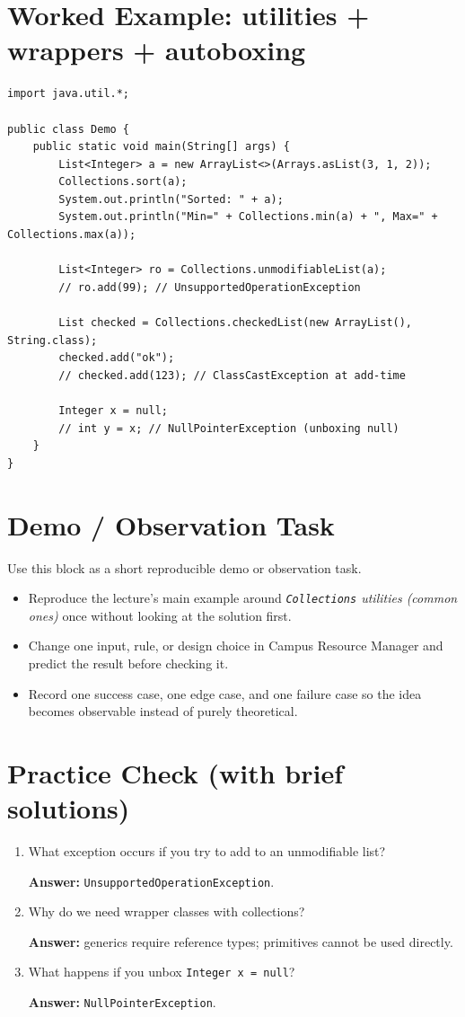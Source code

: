 \documentclass[11pt]{article}
\begin{document}
\section{Worked Example: utilities + wrappers + autoboxing}
\begin{lstlisting}
import java.util.*;

public class Demo {
    public static void main(String[] args) {
        List<Integer> a = new ArrayList<>(Arrays.asList(3, 1, 2));
        Collections.sort(a);
        System.out.println("Sorted: " + a);
        System.out.println("Min=" + Collections.min(a) + ", Max=" + Collections.max(a));

        List<Integer> ro = Collections.unmodifiableList(a);
        // ro.add(99); // UnsupportedOperationException

        List checked = Collections.checkedList(new ArrayList(), String.class);
        checked.add("ok");
        // checked.add(123); // ClassCastException at add-time

        Integer x = null;
        // int y = x; // NullPointerException (unboxing null)
    }
}
\end{lstlisting}

\section{Demo / Observation Task}
Use this block as a short reproducible demo or observation task.
\begin{itemize}
  \item Reproduce the lecture's main example around \textit{\texttt{Collections} utilities (common ones)} once without looking at the solution first.
  \item Change one input, rule, or design choice in Campus Resource Manager and predict the result before checking it.
  \item Record one success case, one edge case, and one failure case so the idea becomes observable instead of purely theoretical.
\end{itemize}
\notesources{\OOPSUnitVSources}

\section{Practice Check (with brief solutions)}
\begin{enumerate}
  \item What exception occurs if you try to add to an unmodifiable list?\par
  \textbf{Answer:} \texttt{UnsupportedOperationException}.

  \item Why do we need wrapper classes with collections?\par
  \textbf{Answer:} generics require reference types; primitives cannot be used directly.

  \item What happens if you unbox \texttt{Integer x = null}?\par
  \textbf{Answer:} \texttt{NullPointerException}.
\end{enumerate}
\end{document}
